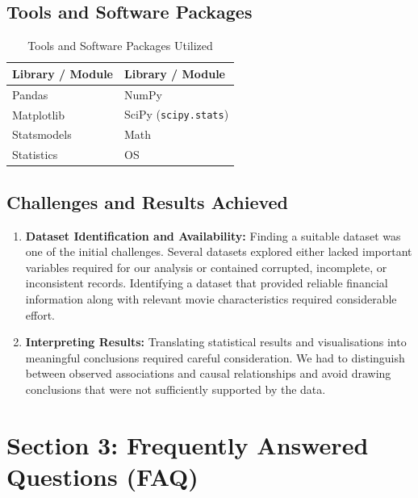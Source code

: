\documentclass[a4paper, 11pt]{article}
\begin{document}
\subsection*{Tools and Software Packages}

\begin{table}[htbp]
\centering
\caption{Tools and Software Packages Utilized}
\label{tab:tools_packages}
\renewcommand{\arraystretch}{1.2}
\begin{tabular}{|l|l|}
\hline
\textbf{Library / Module} & \textbf{Library / Module} \\ \hline
Pandas & NumPy \\ \hline
Matplotlib & SciPy (\texttt{scipy.stats}) \\ \hline
Statsmodels & Math \\ \hline
Statistics & OS \\ \hline
\end{tabular}
\end{table}

\subsection*{Challenges and Results Achieved}

\begin{enumerate}
    \item \textbf{Dataset Identification and Availability:}
    Finding a suitable dataset was one of the initial challenges. Several datasets explored either lacked important variables required for our analysis or contained corrupted, incomplete, or inconsistent records. Identifying a dataset that provided reliable financial information along with relevant movie characteristics required considerable effort.

    \item \textbf{Interpreting Results:}
    Translating statistical results and visualisations into meaningful conclusions required careful consideration. We had to distinguish between observed associations and causal relationships and avoid drawing conclusions that were not sufficiently supported by the data.
\end{enumerate}

\newpage

\section*{Section 3: Frequently Answered Questions (FAQ)}
\end{document}
